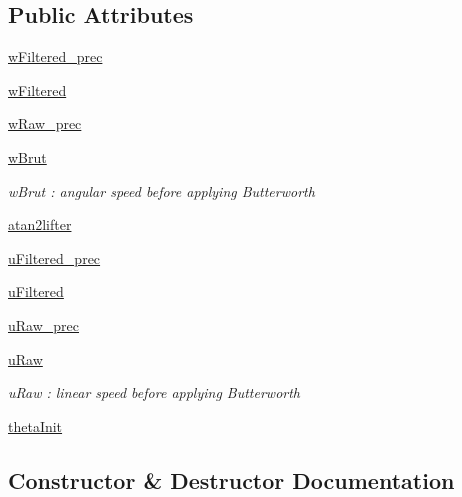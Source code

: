 \subsection*{Public Attributes}
\begin{DoxyCompactItemize}
\item 
\hyperlink{classcmd__TTB_1_1butterworth_1_1ButterworthFilter_ad8a64b6be0a7b11ab2626affc4df0955}{w\+Filtered\+\_\+prec}
\item 
\hyperlink{classcmd__TTB_1_1butterworth_1_1ButterworthFilter_aa31176200eee925ee48f575d6d5acc9e}{w\+Filtered}
\item 
\hyperlink{classcmd__TTB_1_1butterworth_1_1ButterworthFilter_a112d92005652f64e47664227b5cf3c73}{w\+Raw\+\_\+prec}
\item 
\hyperlink{classcmd__TTB_1_1butterworth_1_1ButterworthFilter_a967096c3f7f90d51ee25cabe6153c67c}{w\+Brut}
\begin{DoxyCompactList}\small\item\em w\+Brut \+: angular speed before applying Butterworth \end{DoxyCompactList}\item 
\hyperlink{classcmd__TTB_1_1butterworth_1_1ButterworthFilter_a72fb79f01a2e947721335436d2cfdaa7}{atan2lifter}
\item 
\hyperlink{classcmd__TTB_1_1butterworth_1_1ButterworthFilter_ab699cd8db314b9845544edcf90efccc7}{u\+Filtered\+\_\+prec}
\item 
\hyperlink{classcmd__TTB_1_1butterworth_1_1ButterworthFilter_a1193cc0d35e56c0758e36ccdea45cfd4}{u\+Filtered}
\item 
\hyperlink{classcmd__TTB_1_1butterworth_1_1ButterworthFilter_abadf344eae18ac29ab1b8f2784fef116}{u\+Raw\+\_\+prec}
\item 
\hyperlink{classcmd__TTB_1_1butterworth_1_1ButterworthFilter_a0f4537c092a3823d6285cffd5e2b825f}{u\+Raw}
\begin{DoxyCompactList}\small\item\em u\+Raw \+: linear speed before applying Butterworth \end{DoxyCompactList}\item 
\hyperlink{classcmd__TTB_1_1butterworth_1_1ButterworthFilter_a45ae1004420f2101ad51feec56ae595d}{theta\+Init}
\end{DoxyCompactItemize}


\subsection{Constructor \& Destructor Documentation}
